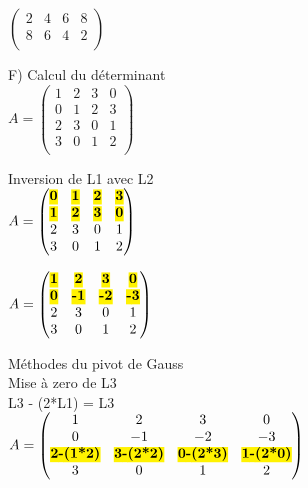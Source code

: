 $
\begin{pmatrix}
  2 & 4 & 6 & 8 \\
  8 & 6 & 4 & 2 \\
\end{pmatrix}
$

\vspace{10mm} %

F) Calcul du déterminant \\

$
A =
\begin{pmatrix}
  1 & 2 & 3 & 0 \\
  0 & 1 & 2 & 3 \\
  2 & 3 & 0 & 1 \\
  3 & 0 & 1 & 2 \\
\end{pmatrix}
$

\vspace{10mm} %
Inversion de L1 avec L2\\

$
A =
\begin{pmatrix}
  \hl{\textbf{0}} & \hl{\textbf{1}} & \hl{\textbf{2}} & \hl{\textbf{3}} \\
  \hl{\textbf{1}} & \hl{\textbf{2}} & \hl{\textbf{3}} & \hl{\textbf{0}} \\
  2 & 3 & 0 & 1 \\
  3 & 0 & 1 & 2 \\
\end{pmatrix}
$
\vspace{5mm} %

$
A =
\begin{pmatrix}
  \hl{\textbf{1}} & \hl{\textbf{2}} & \hl{\textbf{3}} & \hl{\textbf{0}} \\
  \hl{\textbf{0}} & \hl{\textbf{-1}} & \hl{\textbf{-2}} & \hl{\textbf{-3}} \\
  2 & 3 & 0 & 1 \\
  3 & 0 & 1 & 2 \\
\end{pmatrix}
$

\vspace{10mm} %
Méthodes du pivot de Gauss \\

\vspace{10mm} %
Mise à zero de L3 \\
L3 - (2*L1) = L3 \\

$
A =
\begin{pmatrix}
  1 & 2 & 3 & 0 \\
  0 & -1 & -2 & -3 \\
  \hl{\textbf{2-(1*2)}} & \hl{\textbf{3-(2*2)}} & \hl{\textbf{0-(2*3)}} & \hl{\textbf{1-(2*0)}} \\
  3 & 0 & 1 & 2 \\
\end{pmatrix}
$

